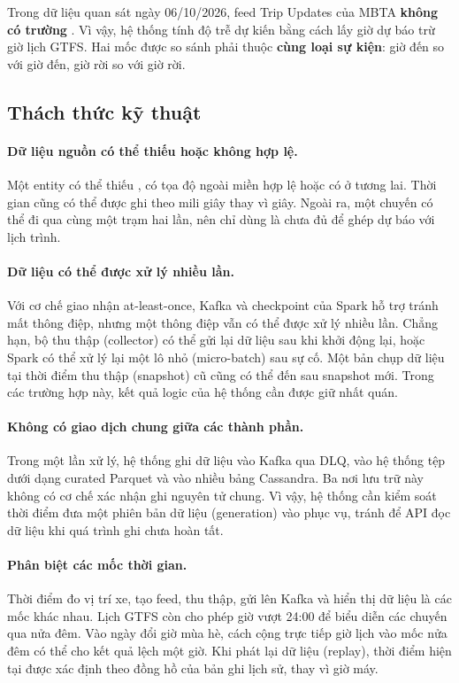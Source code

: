 Trong dữ liệu quan sát ngày 06/10/2026, feed Trip Updates của MBTA \textbf{không có trường }. Vì vậy, hệ thống tính độ trễ dự kiến bằng cách lấy giờ dự báo trừ giờ lịch GTFS. Hai mốc được so sánh phải thuộc \textbf{cùng loại sự kiện}: giờ đến so với giờ đến, giờ rời so với giờ rời.

\subsection{Thách thức kỹ thuật}

\paragraph{Dữ liệu nguồn có thể thiếu hoặc không hợp lệ.} Một entity có thể thiếu , có tọa độ ngoài miền hợp lệ hoặc có  ở tương lai. Thời gian cũng có thể được ghi theo mili giây thay vì giây. Ngoài ra, một chuyến có thể đi qua cùng một trạm hai lần, nên chỉ dùng  là chưa đủ để ghép dự báo với lịch trình.

\paragraph{Dữ liệu có thể được xử lý nhiều lần.} Với cơ chế giao nhận at-least-once, Kafka và checkpoint của Spark hỗ trợ tránh mất thông điệp, nhưng một thông điệp vẫn có thể được xử lý nhiều lần. Chẳng hạn, bộ thu thập (collector) có thể gửi lại dữ liệu sau khi khởi động lại, hoặc Spark có thể xử lý lại một lô nhỏ (micro-batch) sau sự cố. Một bản chụp dữ liệu tại thời điểm thu thập (snapshot) cũ cũng có thể đến sau snapshot mới. Trong các trường hợp này, kết quả logic của hệ thống cần được giữ nhất quán.

\paragraph{Không có giao dịch chung giữa các thành phần.} Trong một lần xử lý, hệ thống ghi dữ liệu vào Kafka qua DLQ, vào hệ thống tệp dưới dạng curated Parquet và vào nhiều bảng Cassandra. Ba nơi lưu trữ này không có cơ chế xác nhận ghi nguyên tử chung. Vì vậy, hệ thống cần kiểm soát thời điểm đưa một phiên bản dữ liệu (generation) vào phục vụ, tránh để API đọc dữ liệu khi quá trình ghi chưa hoàn tất.

\paragraph{Phân biệt các mốc thời gian.} Thời điểm đo vị trí xe, tạo feed, thu thập, gửi lên Kafka và hiển thị dữ liệu là các mốc khác nhau. Lịch GTFS còn cho phép giờ vượt 24:00 để biểu diễn các chuyến qua nửa đêm. Vào ngày đổi giờ mùa hè, cách cộng trực tiếp giờ lịch vào mốc nửa đêm có thể cho kết quả lệch một giờ. Khi phát lại dữ liệu (replay), thời điểm hiện tại được xác định theo đồng hồ của bản ghi lịch sử, thay vì giờ máy.

